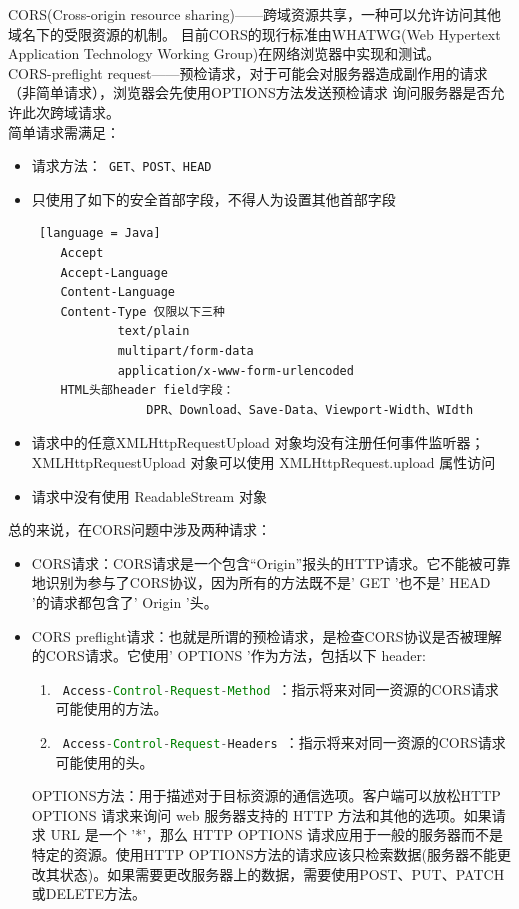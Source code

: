 \begin{enumerate}
        CORS(Cross-origin resource sharing)——跨域资源共享，一种可以允许访问其他域名下的受限资源的机制。
        目前CORS的现行标准由WHATWG(Web Hypertext Application Technology Working Group)在网络浏览器中实现和测试。\\
        CORS-preflight request——预检请求，对于可能会对服务器造成副作用的请求（非简单请求），浏览器会先使用OPTIONS方法发送预检请求
        询问服务器是否允许此次跨域请求。\\
        简单请求需满足：
        \begin{itemize}
          \item 请求方法：\lstinline[language = xml]| GET、POST、HEAD |
          \item 只使用了如下的安全首部字段，不得人为设置其他首部字段\begin{lstlisting} [language = Java]
    Accept
    Accept-Language
    Content-Language
    Content-Type 仅限以下三种
            text/plain
            multipart/form-data
            application/x-www-form-urlencoded
    HTML头部header field字段：
                DPR、Download、Save-Data、Viewport-Width、WIdth
              \end{lstlisting}
          \item 请求中的任意XMLHttpRequestUpload 对象均没有注册任何事件监听器；XMLHttpRequestUpload 对象可以使用 XMLHttpRequest.upload 属性访问
          \item 请求中没有使用 ReadableStream 对象
        \end{itemize}
        总的来说，在CORS问题中涉及两种请求：
        \begin{itemize}
          \item CORS请求：CORS请求是一个包含“Origin”报头的HTTP请求。它不能被可靠地识别为参与了CORS协议，因为所有的方法既不是' GET '也不是' HEAD '的请求都包含了' Origin '头。
          \item CORS preflight请求：也就是所谓的预检请求，是检查CORS协议是否被理解的CORS请求。它使用' OPTIONS '作为方法，包括以下 header:
                \begin{enumerate}
                  \item \lstinline[language = Java]| Access-Control-Request-Method |：指示将来对同一资源的CORS请求可能使用的方法。
                  \item \lstinline[language = Java]| Access-Control-Request-Headers |：指示将来对同一资源的CORS请求可能使用的头。
                \end{enumerate}
                OPTIONS方法：用于描述对于目标资源的通信选项。客户端可以放松HTTP OPTIONS 请求来询问 web 服务器支持的 HTTP 方法和其他的选项。如果请求 URL 是一个 '*'，那么 HTTP OPTIONS 请求应用于一般的服务器而不是特定的资源。使用HTTP OPTIONS方法的请求应该只检索数据(服务器不能更改其状态)。如果需要更改服务器上的数据，需要使用POST、PUT、PATCH或DELETE方法。

\end{itemize}
\end{enumerate}
